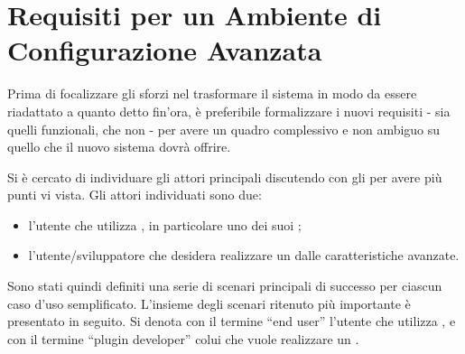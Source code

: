 \section{Requisiti per un Ambiente di Configurazione Avanzata}
Prima di focalizzare gli sforzi nel trasformare il sistema in modo da essere riadattato a quanto detto fin'ora, è preferibile formalizzare i nuovi requisiti - sia quelli funzionali, che non - per avere un quadro complessivo e non ambiguo su quello che il nuovo sistema dovrà offrire. 

Si è cercato di individuare gli attori principali discutendo con gli \stakeholders{} per avere più punti vi vista. Gli attori individuati sono due:
\begin{itemize}
\item l'utente che utilizza \visualnetkit{}, in particolare uno dei suoi \plugin{};
\item l'utente/sviluppatore che desidera realizzare un \plugin{} dalle caratteristiche avanzate.
\end{itemize}
Sono stati quindi definiti una serie di scenari principali di successo per ciascun caso d'uso semplificato. L'insieme degli scenari ritenuto più importante è presentato in seguito. Si denota con il termine ``end user'' l'utente che utilizza \visualnetkit{}, e con il termine ``plugin developer'' colui che vuole realizzare un \plugin{}.

